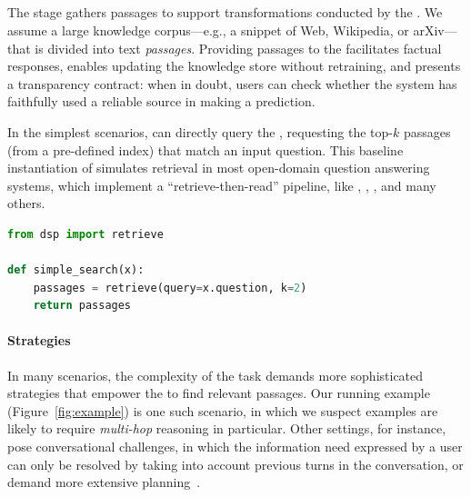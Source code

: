  


\subsection{\search}
\label{sec:dsp:search}








The \search stage gathers passages to support transformations conducted by the \LM{}. We assume a large knowledge corpus---e.g., a snippet of Web, Wikipedia, or arXiv---that is divided into text \textit{passages}.
Providing passages to the \LM{} facilitates factual responses, enables updating the knowledge store without retraining, and presents a transparency contract: when in doubt, users can check whether the system has faithfully used a reliable source in making a prediction.


In the simplest scenarios, \search can directly query the \RM{}, requesting the top-$k$ passages (from a pre-defined index) that match an input question. This baseline instantiation of \search simulates retrieval in most open-domain question answering systems, which implement a ``retrieve-then-read'' pipeline, like \citet{lee2019latent}, \citet{khattab2021relevance}, \citet{lazaridou2022internet}, and many others.

\begin{samepage}

\begin{lstlisting}[language=Python,breaklines=true]
from dsp import retrieve

def simple_search(x):
    passages = retrieve(query=x.question, k=2)
    return passages
\end{lstlisting}
\end{samepage}

\vspace{-2mm}
\paragraph{\search Strategies}



In many scenarios, the complexity of the task demands more sophisticated \search strategies that empower the \RM{} to find relevant passages. Our running example (Figure~\ref{fig:example}) is one such scenario, in which we suspect examples are likely to require \textit{multi-hop} reasoning in particular. Other settings, for instance, pose conversational challenges, in which the information need expressed by a user can only be resolved by taking into account previous turns in the conversation, or demand more extensive planning~\cite{zhong2022romqa}.

